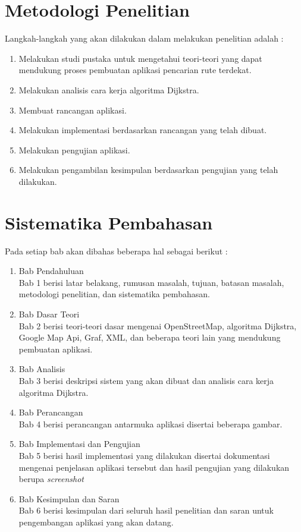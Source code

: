 \section{Metodologi Penelitian}
Langkah-langkah yang akan dilakukan dalam melakukan penelitian adalah :
\begin{enumerate}
	\item Melakukan studi pustaka untuk mengetahui teori-teori yang dapat mendukung
	proses pembuatan aplikasi pencarian rute terdekat.
	\item Melakukan analisis cara kerja algoritma Dijkstra.
	\item Membuat rancangan aplikasi.
	\item Melakukan implementasi berdasarkan rancangan yang telah dibuat.
	\item Melakukan pengujian aplikasi.
	\item Melakukan pengambilan kesimpulan berdasarkan pengujian yang telah dilakukan.
\end{enumerate}

\section{Sistematika Pembahasan}
Pada setiap bab akan dibahas beberapa hal sebagai berikut :
\begin{enumerate}
	\item Bab Pendahuluan\\
	Bab 1 berisi latar belakang, rumusan masalah, tujuan, batasan masalah, metodologi penelitian, dan sistematika pembahasan.
	
	\item Bab Dasar Teori\\
	Bab 2 berisi teori-teori dasar mengenai OpenStreetMap, algoritma Dijkstra,
	Google Map Api, Graf, XML, dan beberapa teori lain yang mendukung pembuatan
	aplikasi.
	
	\item Bab Analisis\\
	Bab 3 berisi deskripsi sistem yang akan dibuat dan analisis cara kerja
	algoritma Dijkstra.
	
	\item Bab Perancangan\\
	Bab 4 berisi perancangan antarmuka aplikasi disertai beberapa gambar.
	
	\item Bab Implementasi dan Pengujian\\
	Bab 5 berisi hasil implementasi yang dilakukan disertai dokumentasi mengenai
	penjelasan aplikasi tersebut dan hasil pengujian yang dilakukan berupa
	\textit{screenshot}
	
	\item Bab Kesimpulan dan Saran\\
	Bab 6 berisi kesimpulan dari seluruh hasil penelitian dan saran untuk
	pengembangan aplikasi yang akan datang.
\end{enumerate}